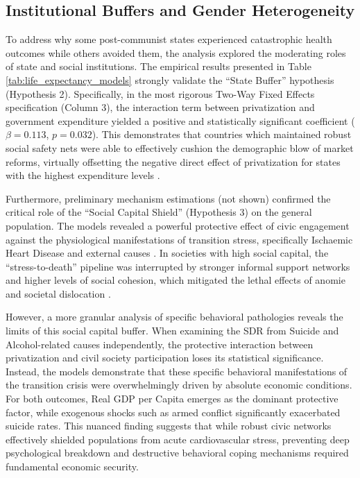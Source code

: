 \documentclass[12pt]{article}
\begin{document}
\subsection{Institutional Buffers and Gender Heterogeneity}

To address why some post-communist states experienced catastrophic health outcomes while others avoided them, the analysis explored the moderating roles of state and social institutions. 
The empirical results presented in Table \ref{tab:life_expectancy_models} strongly validate the ``State Buffer'' hypothesis (Hypothesis 2). Specifically, in the most rigorous Two-Way Fixed 
Effects specification (Column 3), the interaction term between privatization and government expenditure yielded a positive and statistically significant coefficient ($\beta = 0.113$, 
$p = 0.032$). This demonstrates that countries which maintained robust social safety nets were able to effectively cushion the demographic blow of market reforms, virtually offsetting the 
negative direct effect of privatization for states with the highest expenditure levels \citep{Cornia2016, Hamm2012}.

Furthermore, preliminary mechanism estimations (not shown) confirmed the critical role of the ``Social Capital Shield'' (Hypothesis 3) on the general population. The models revealed a 
powerful protective effect of civic engagement against the physiological manifestations of transition stress, specifically Ischaemic Heart Disease and external causes \citep{Leon1998, 
Brainerd2006}. In societies with high social capital, the ``stress-to-death'' pipeline was interrupted by stronger informal support networks and higher levels of social cohesion, which 
mitigated the lethal effects of anomie and societal dislocation \citep{Cornia2016, Stuckler2009}. 

However, a more granular analysis of specific behavioral pathologies reveals the limits of this social capital buffer. When examining the SDR from Suicide and Alcohol-related causes 
independently, the protective interaction between privatization and civil society participation loses its statistical significance. Instead, the models demonstrate that these specific 
behavioral manifestations of the transition crisis were overwhelmingly driven by absolute economic conditions. For both outcomes, Real GDP per Capita emerges as the dominant protective 
factor, while exogenous shocks such as armed conflict significantly exacerbated suicide rates. This nuanced finding suggests that while robust civic networks effectively shielded populations 
from acute cardiovascular stress, preventing deep psychological breakdown and destructive behavioral coping mechanisms required fundamental economic security.
\end{document}
